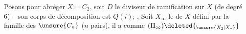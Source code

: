 Posons pour abréger $X=C_2$, soit $D$ le diviseur de ramification sur $X$ (de degré 6) -- son corps de décomposition est $Q(i)$; ,
Soit $X_\infty$ le   de $X$ défini par la famille des $\unsure{C_n}$ ($n$ pairs), il a comme  $(\Pi_\infty)\deleted{_{\unsure{X_2|X_*}}}$
